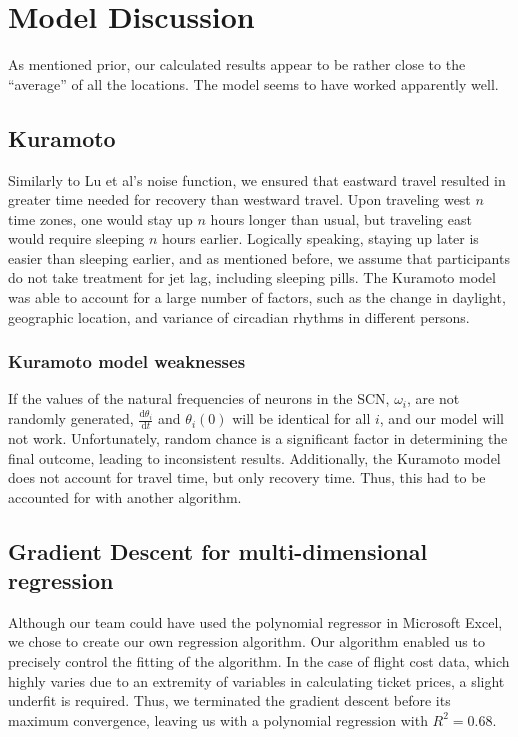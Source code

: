 \section{Model Discussion}
As mentioned prior, our calculated results appear to be rather close to the ``average'' of all the locations. The model seems to have worked apparently well.


\subsection{Kuramoto}
Similarly to Lu et al's noise function, we ensured that eastward travel resulted in greater time needed for recovery than westward travel. Upon traveling west $n$ time zones, one would stay up $n$ hours longer than usual, but traveling east would require sleeping $n$ hours earlier. Logically speaking, staying up later is easier than sleeping earlier, and as mentioned before, we assume that participants do not take treatment for jet lag, including sleeping pills. The Kuramoto model was able to account for a large number of factors, such as the change in daylight, geographic location, and variance of circadian rhythms in different persons. 


\subsubsection*{Kuramoto model weaknesses}
If the values of the natural frequencies of neurons in the SCN, $\omega_i$, are not randomly generated, $\frac{\mathrm{d} \theta_i}{\mathrm{d} t}$ and $\theta_i(0)$ will be identical for all $i$, and our model will not work. Unfortunately, random chance is a significant factor in determining the final outcome, leading to inconsistent results. Additionally, the Kuramoto model does not account for travel time, but only recovery time. Thus, this had to be accounted for with another algorithm.


\subsection{Gradient Descent for multi-dimensional regression}
Although our team could have used the polynomial regressor in Microsoft Excel, we chose to create our own regression algorithm. Our algorithm enabled us to precisely control the fitting of the algorithm. In the case of flight cost data, which highly varies due to an extremity of variables in calculating ticket prices, a slight underfit is required. Thus, we terminated the gradient descent before its maximum convergence, leaving us with a polynomial regression with $R^2 = 0.68$. 



